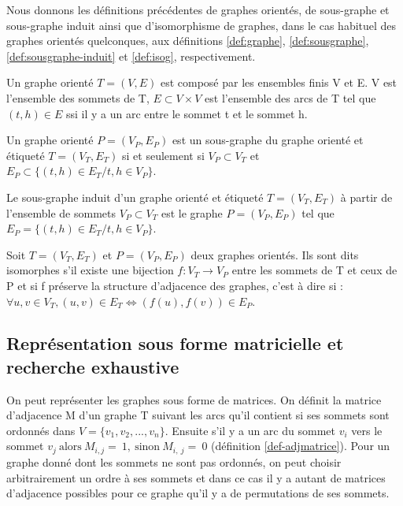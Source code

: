 Nous donnons les définitions précédentes de graphes orientés, de sous-graphe et sous-graphe induit ainsi que d'isomorphisme de graphes, dans le cas habituel des graphes orientés quelconques, aux définitions \ref{def:graphe}, \ref{def:sousgraphe}, \ref{def:sousgraphe-induit} et \ref{def:isog}, respectivement.

\begin{defi}\label{def:graphe}
Un graphe orienté $T=(V, E)$ est composé par les ensembles finis V et E.
V est l'ensemble des sommets de T, $E\subset V\times V$ est l'ensemble des arcs de T tel que $(t, h)\in E$ ssi il y a un arc entre le sommet t et le sommet h.
\end{defi}

\begin{defi}\label{def:sousgraphe}
Un graphe orienté $P=(V_P, E_P)$ est un sous-graphe du graphe orienté et étiqueté $T=(V_T, E_T)$ si et seulement si $V_P \subset V_T$ et $E_P\subset\{(t, h)\in E_T / t, h \in V_P \}$.
\end{defi}

\begin{defi}\label{def:sousgraphe-induit}
Le sous-graphe induit d'un graphe orienté et étiqueté $T=(V_T, E_T)$ à partir de l'ensemble de sommets $V_P \subset V_T$ est le graphe $P=(V_P, E_P)$ tel que $E_P=\{(t, h)\in E_T / t, h \in V_P \}$.
\end{defi}

\begin{defi}\label{def:isog}
Soit $T=(V_T, E_T)$ et $P=(V_P, E_P)$ deux graphes orientés. Ils sont dits isomorphes s'il existe une bijection $f:V_T\rightarrow V_P$ entre les sommets de T et ceux de P et si f préserve la structure d'adjacence des graphes, c'est à dire si : $\forall u, v \in V_T, (u, v) \in E_T \Leftrightarrow (f(u), f(v)) \in E_P$.
\end{defi}

\subsection{Représentation sous forme matricielle et recherche exhaustive}
On peut représenter les graphes sous forme de matrices. On définit la matrice d'adjacence M d'un graphe T suivant les arcs qu'il contient si ses sommets sont ordonnés dans $V=\{v_1, v_2, ..., v_n\}$. Ensuite s'il y a un arc du sommet $v_i$ vers le sommet
$v_j~\mbox{alors}~M_{i, j}=~1,~\mbox{sinon}~M_{i,~j}=~0$ (définition \ref{def-adjmatrice}).
Pour un graphe donné dont les sommets ne sont pas ordonnés, on peut choisir arbitrairement un ordre à ses sommets et dans ce cas il y a autant de matrices d'adjacence possibles pour ce graphe qu'il y a de permutations de ses sommets. 

